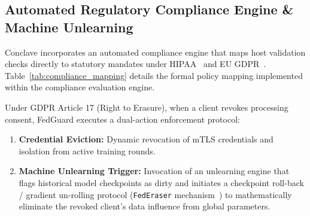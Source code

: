 \subsection{Automated Regulatory Compliance Engine \& Machine Unlearning}

Conclave incorporates an automated compliance engine that maps host validation checks directly to statutory mandates under HIPAA~\cite{hipaa2003security} and EU GDPR~\cite{gdpr2016regulation}. Table~\ref{tab:compliance_mapping} details the formal policy mapping implemented within the compliance evaluation engine.

\begin{table}[htbp]
\caption{Statutory Regulatory Compliance Mapping in FedGuard}
\begin{center}
\label{tab:compliance_mapping}
\end{center}
\end{table}

Under GDPR Article 17 (Right to Erasure), when a client revokes processing consent, FedGuard executes a dual-action enforcement protocol:
\begin{enumerate}
    \item \textbf{Credential Eviction:} Dynamic revocation of mTLS credentials and isolation from active training rounds.
    \item \textbf{Machine Unlearning Trigger:} Invocation of an unlearning engine that flags historical model checkpoints as dirty and initiates a checkpoint roll-back / gradient un-rolling protocol (\texttt{FedEraser} mechanism~\cite{liu2021federaser}) to mathematically eliminate the revoked client's data influence from global parameters.
\end{enumerate}

